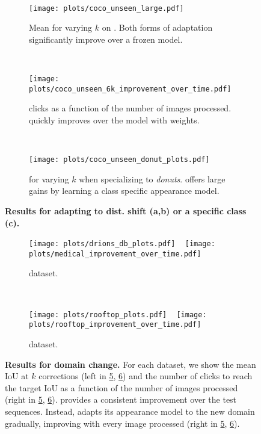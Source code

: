 \begin{figure}[t]
    \centering
    ~
   \begin{subfigure}[t]{0.3\textwidth}
    \texttt{[image: plots/coco\_unseen\_large.pdf]}
    \caption{Mean \iouAtK{} for varying $k$ on \cocounseenlarge{}.
    Both forms of adaptation significantly improve over a frozen model.
    }
    \label{fig:coco_unseen_6k_iou_at_k}
    \end{subfigure}
    ~
    \begin{subfigure}[t]{0.3\textwidth}
    \texttt{[image: plots/coco\_unseen\_6k\_improvement\_over\_time.pdf]}
    \caption{ clicks as a function of the number of images processed.
    \sequenceadaptationshort{} quickly improves over the model with \fixedmodel{} weights.
    }
    \label{fig:coco_unseen_6k_over_time}
    \end{subfigure}
    ~    
    \begin{subfigure}[t]{0.3\textwidth}
    \texttt{[image: plots/coco\_unseen\_donut\_plots.pdf]}
    \caption{
    \iouAtK{} for varying $k$ when specializing to \textit{donuts}.	
    \sequenceadaptationshort{} offers large gains
    by learning a class specific appearance model.
    }
    \label{fig:coco_unseen_donut_clicks_plot}
    \end{subfigure}
    \caption{\textbf{Results for adapting to dist. shift (a,b) or a specific class (c).}
    } 
    \label{fig:curve_collection_distribution}
\end{figure}
\begin{figure}[t!]   
    \begin{subfigure}[t]{0.50\textwidth}
    \texttt{[image: plots/drions\_db\_plots.pdf]}
    ~
    \texttt{[image: plots/medical\_improvement\_over\_time.pdf]}
    \caption{\medical{} dataset.
    }
    \label{fig:drions_sequence_adaptation}
    \end{subfigure}
    ~
    \begin{subfigure}[t]{0.50\textwidth}
    \texttt{[image: plots/rooftop\_plots.pdf]}
    ~
    \texttt{[image: plots/rooftop\_improvement\_over\_time.pdf]}
    \caption{\rooftop{} dataset.
    }
    \label{fig:rooftop_improvement_smoothed}
    \end{subfigure}
    \caption{\textbf{Results for domain change.}
    For each dataset, we show the mean IoU at $k$ corrections (left in \ref{fig:drions_sequence_adaptation}, \ref{fig:rooftop_improvement_smoothed}) and the number of clicks to reach the target IoU as a function of the number of images processed (right in \ref{fig:drions_sequence_adaptation}, \ref{fig:rooftop_improvement_smoothed}).
    \uc \imageSGD{} provides a consistent improvement over the test sequences.
    Instead, \datasetSGD{} adapts its appearance model to the new domain gradually, improving with every image processed (right in \ref{fig:drions_sequence_adaptation}, \ref{fig:rooftop_improvement_smoothed}).
    }
    \label{fig:domain_adapt}

\end{figure}
